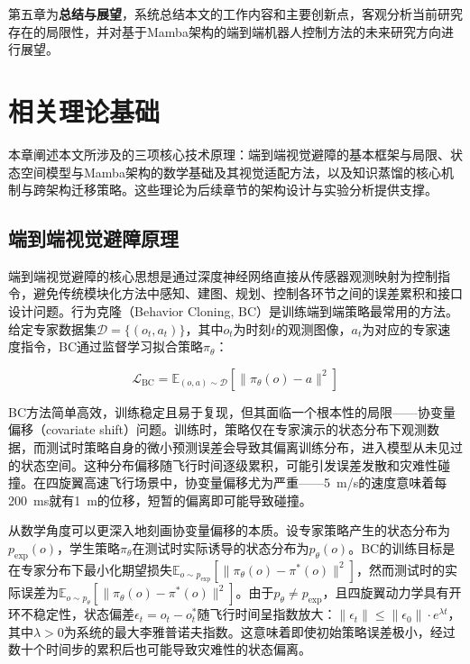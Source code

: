 \documentclass[12pt,a4paper]{article}
\makeatletter
\numberwithin{equation}{section}
\numberwithin{figure}{section}
\numberwithin{table}{section}
\newcommand{\cleardoublepage}{\clearpage\if@twoside\ifodd\c@page\else\hbox{}\thispagestyle{empty}\newpage\if@twocolumn\hbox{}\newpage\fi\fi\fi}%
\makeatother
\begin{document}
第五章为\textbf{总结与展望}，系统总结本文的工作内容和主要创新点，客观分析当前研究存在的局限性，并对基于Mamba架构的端到端机器人控制方法的未来研究方向进行展望。


\cleardoublepage
\section{相关理论基础}

本章阐述本文所涉及的三项核心技术原理：端到端视觉避障的基本框架与局限、状态空间模型与Mamba架构的数学基础及其视觉适配方法，以及知识蒸馏的核心机制与跨架构迁移策略。这些理论为后续章节的架构设计与实验分析提供支撑。

\subsection{端到端视觉避障原理}

端到端视觉避障的核心思想是通过深度神经网络直接从传感器观测映射为控制指令，避免传统模块化方法中感知、建图、规划、控制各环节之间的误差累积和接口设计问题。行为克隆（Behavior Cloning, BC）是训练端到端策略最常用的方法。给定专家数据集$\mathcal{D} = \{(o_t, a_t)\}$，其中$o_t$为时刻$t$的观测图像，$a_t$为对应的专家速度指令，BC通过监督学习拟合策略$\pi_\theta$：

\begin{equation}
\mathcal{L}_{\text{BC}} = \mathbb{E}_{(o,a) \sim \mathcal{D}}\left[\|\pi_\theta(o) - a\|^2\right]
\label{eq:bc_loss}
\end{equation}

BC方法简单高效，训练稳定且易于复现，但其面临一个根本性的局限——协变量偏移（covariate shift）问题。训练时，策略仅在专家演示的状态分布下观测数据，而测试时策略自身的微小预测误差会导致其偏离训练分布，进入模型从未见过的状态空间。这种分布偏移随飞行时间逐级累积，可能引发误差发散和灾难性碰撞。在四旋翼高速飞行场景中，协变量偏移尤为严重——5~m/s的速度意味着每200~ms就有1~m的位移，短暂的偏离即可能导致碰撞。

从数学角度可以更深入地刻画协变量偏移的本质。设专家策略产生的状态分布为$p_{\text{exp}}(o)$，学生策略$\pi_\theta$在测试时实际诱导的状态分布为$p_{\theta}(o)$。BC的训练目标是在专家分布下最小化期望损失$\mathbb{E}_{o \sim p_{\text{exp}}}[\|\pi_\theta(o) - \pi^*(o)\|^2]$，然而测试时的实际误差为$\mathbb{E}_{o \sim p_{\theta}}[\|\pi_\theta(o) - \pi^*(o)\|^2]$。由于$p_{\theta} \neq p_{\text{exp}}$，且四旋翼动力学具有开环不稳定性，状态偏差$\epsilon_t = o_t - o_t^*$随飞行时间呈指数放大：$\|\epsilon_t\| \leq \|\epsilon_0\| \cdot e^{\lambda t}$，其中$\lambda > 0$为系统的最大李雅普诺夫指数。这意味着即使初始策略误差极小，经过数十个时间步的累积后也可能导致灾难性的状态偏离。
\end{document}
